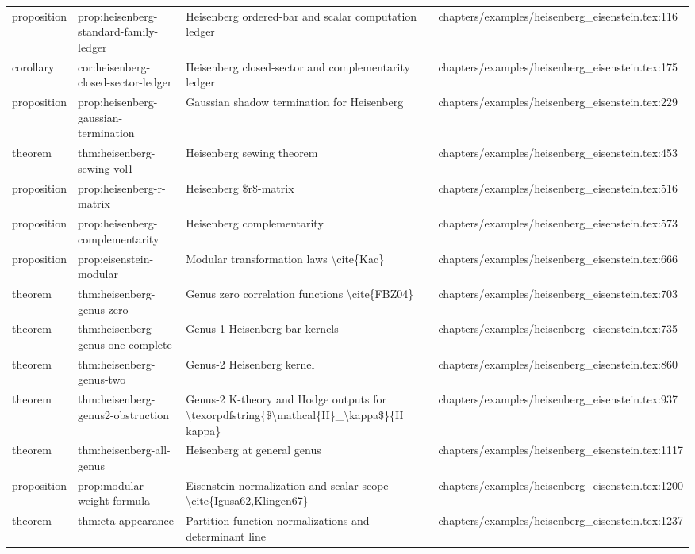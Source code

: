 \documentclass[11pt]{article}
\begin{document}
\begin{longtable}{L{0.10\textwidth}L{0.26\textwidth}L{0.42\textwidth}L{0.22\textwidth}}
proposition & prop:heisenberg-standard-family-led{}ger & Heisenberg ordered-bar and scalar computation led{}ger & chapters/examples/heisenberg\_eisenstein.tex:116\\
corollary & cor:heisenberg-closed-sector-led{}ger & Heisenberg closed-sector and complementarity led{}ger & chapters/examples/heisenberg\_eisenstein.tex:175\\
proposition & prop:heisenberg-gaussian-termination & Gaussian shadow termination for Heisenberg & chapters/examples/heisenberg\_eisenstein.tex:229\\
theorem & thm:heisenberg-sewing-vol1 & Heisenberg sewing theorem & chapters/examples/heisenberg\_eisenstein.tex:453\\
proposition & prop:heisenberg-r-matrix & Heisenberg \$r\$-matrix & chapters/examples/heisenberg\_eisenstein.tex:516\\
proposition & prop:heisenberg-complementarity & Heisenberg complementarity & chapters/examples/heisenberg\_eisenstein.tex:573\\
proposition & prop:eisenstein-modular & Modular transformation laws \textbackslash{}cite\{Kac\} & chapters/examples/heisenberg\_eisenstein.tex:666\\
theorem & thm:heisenberg-genus-zero & Genus zero correlation functions \textbackslash{}cite\{FBZ04\} & chapters/examples/heisenberg\_eisenstein.tex:703\\
theorem & thm:heisenberg-genus-one-complete & Genus-1 Heisenberg bar kernels & chapters/examples/heisenberg\_eisenstein.tex:735\\
theorem & thm:heisenberg-genus-two & Genus-2 Heisenberg kernel & chapters/examples/heisenberg\_eisenstein.tex:860\\
theorem & thm:heisenberg-genus2-obstruction & Genus-2 K-theory and Hodge outputs for \textbackslash{}texorpdfstring\{\$\textbackslash{}mathcal\{H\}\_\textbackslash{}kappa\$\}\{H kappa\} & chapters/examples/heisenberg\_eisenstein.tex:937\\
theorem & thm:heisenberg-all-genus & Heisenberg at general genus & chapters/examples/heisenberg\_eisenstein.tex:1117\\
proposition & prop:modular-weight-formula & Eisenstein normalization and scalar scope \textbackslash{}cite\{Igusa62,Klingen67\} & chapters/examples/heisenberg\_eisenstein.tex:1200\\
theorem & thm:eta-appearance & Partition-function normalizations and determinant line & chapters/examples/heisenberg\_eisenstein.tex:1237\\

\end{longtable}
\end{document}
